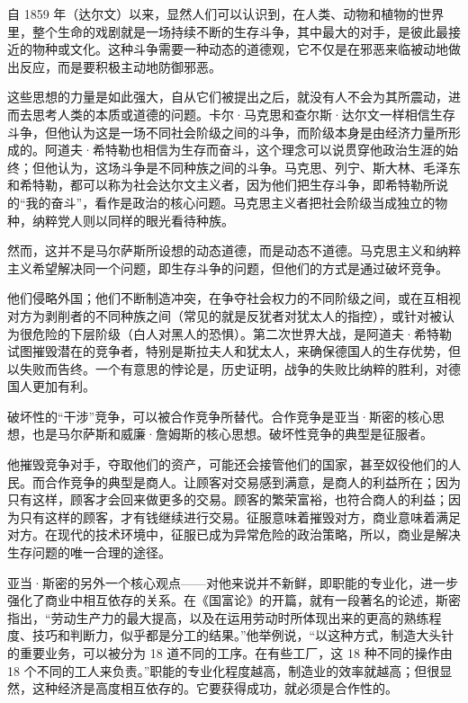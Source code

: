 自 1859 年（达尔文）以来，显然人们可以认识到，在人类、动物和植物的世界里，整个生命的戏剧就是一场持续不断的生存斗争，其中最大的对手，是彼此最接近的物种或文化。这种斗争需要一种动态的道德观，它不仅是在邪恶来临被动地做出反应，而是要积极主动地防御邪恶。

这些思想的力量是如此强大，自从它们被提出之后，就没有人不会为其所震动，进而去思考人类的本质或道德的问题。卡尔·马克思和查尔斯·达尔文一样相信生存斗争，但他认为这是一场不同社会阶级之间的斗争，而阶级本身是由经济力量所形成的。阿道夫·希特勒也相信为生存而奋斗，这个理念可以说贯穿他政治生涯的始终；但他认为，这场斗争是不同种族之间的斗争。马克思、列宁、斯大林、毛泽东和希特勒，都可以称为社会达尔文主义者，因为他们把生存斗争，即希特勒所说的“我的奋斗”，看作是政治的核心问题。马克思主义者把社会阶级当成独立的物种，纳粹党人则以同样的眼光看待种族。

然而，这并不是马尔萨斯所设想的动态道德，而是动态不道德。马克思主义和纳粹主义希望解决同一个问题，即生存斗争的问题，但他们的方式是通过破坏竞争。

他们侵略外国；他们不断制造冲突，在争夺社会权力的不同阶级之间，或在互相视对方为剥削者的不同种族之间（常见的就是反犹者对犹太人的指控），或针对被认为很危险的下层阶级（白人对黑人的恐惧）。第二次世界大战，是阿道夫·希特勒试图摧毁潜在的竞争者，特别是斯拉夫人和犹太人，来确保德国人的生存优势，但以失败而告终。一个有意思的悖论是，历史证明，战争的失败比纳粹的胜利，对德国人更加有利。

破坏性的“干涉”竞争，可以被合作竞争所替代。合作竞争是亚当·斯密的核心思想，也是马尔萨斯和威廉·詹姆斯的核心思想。破坏性竞争的典型是征服者。

他摧毁竞争对手，夺取他们的资产，可能还会接管他们的国家，甚至奴役他们的人民。而合作竞争的典型是商人。让顾客对交易感到满意，是商人的利益所在；因为只有这样，顾客才会回来做更多的交易。顾客的繁荣富裕，也符合商人的利益；因为只有这样的顾客，才有钱继续进行交易。征服意味着摧毁对方，商业意味着满足对方。在现代的技术环境中，征服已成为异常危险的政治策略，所以，商业是解决生存问题的唯一合理的途径。

亚当·斯密的另外一个核心观点——对他来说并不新鲜，即职能的专业化，进一步强化了商业中相互依存的关系。在《国富论》的开篇，就有一段著名的论述，斯密指出，“劳动生产力的最大提高，以及在运用劳动时所体现出来的更高的熟练程度、技巧和判断力，似乎都是分工的结果。”他举例说，“以这种方式，制造大头针的重要业务，可以被分为 18 道不同的工序。在有些工厂，这 18 种不同的操作由 18 个不同的工人来负责。”职能的专业化程度越高，制造业的效率就越高；但很显然，这种经济是高度相互依存的。它要获得成功，就必须是合作性的。

